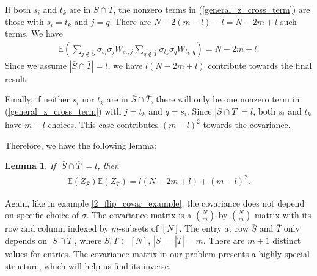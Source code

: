 \documentclass[10pt]{article}
\newcommand{\e}{\mathbb{E}}
\newtheorem{lemma}{\bf Lemma}
\newenvironment{Proof of lemma}{\noindent{\bf Proof of Lemma}}{\hfill$\Box$\newline}
\newenvironment{Proof of claim}{\noindent{\bf Proof of claim}}{\hfill$\Box$\newline}
\newenvironment{Proof of theorem}{\noindent{\bf Proof of Theorem}}{\hfill\scriptsize{$\Box$}\newline}
\newenvironment{Proof of theorems}{\noindent{\bf Proof of Theorems}}{\hfill$\Box$\newline}
\newenvironment{Proof of proposition}{\noindent{\bf Proof of Proposition}}{\hfill$\Box$\newline}
\newenvironment{Proof of propositions}{\noindent{\bf Proof of Propositions}}{\hfill$\Box$\newline}
\newenvironment{Proof of exercise}{\noindent{\it Proof of Exercise:}}{\hfill$\Box$}
\numberwithin{equation}{section}
\begin{document}
If both $s_i$ and $t_k$ are in $\bar{S} \cap \bar{T}$, the nonzero terms in (\ref{general_z_cross_term}) are those with $s_i = t_k$ and $j=q$. There are $N-2(m-l)-l = N-2m+l$ such terms. We have
\begin{align}
    \e \left(\sum_{j \notin \bar{S}} \sigma_{s_i} \sigma_j W_{s_i,j} \sum_{q \notin \bar{T}} \sigma_{t_k} \sigma_q W_{t_k,q} \right) = N-2m+l.
\end{align}
Since we assume $|\bar{S} \cap \bar{T}| = l$, we have $l(N-2m+l)$ contribute towards the final result.

Finally, if neither $s_i$ nor $t_k$ are in $\bar{S} \cap \bar{T}$, there will only be one nonzero term in (\ref{general_z_cross_term}) with $j = t_k$ and $q = s_i$. Since $|\bar{S} \cap \bar{T}| = l$, both $s_i$ and $t_k$ have $m-l$ choices. This case contributes $(m-l)^2$ towards the covariance.

Therefore, we have the following lemma:
\begin{lemma} \label{covar_lemma}
    If $|\bar{S} \cap \bar{T}| = l$, then
\begin{align} \label{covar_entry}
    \e(Z_{\bar{S}})\e(Z_{\bar{T}}) = l(N-2m+l)+(m-l)^2.
\end{align}
\end{lemma}


Again, like in example \ref{2_flip_covar_example}, the covariance does not depend on specific choice of $\sigma$. The covariance matrix is a $\binom{N}{m}$-by-$\binom{N}{m}$ matrix with its row and column indexed by $m$-subsets of $[N]$. The entry at row $\bar{S}$ and $\bar{T}$ only depends on $|\bar{S} \cap \bar{T}|$, where $\bar{S},\bar{T} \subset [N]$, $|\bar{S}| = |\bar{T}| = m$. There are $m+1$ distinct values for entries. The covariance matrix in our problem presents a highly special structure, which will help us find its inverse. 
\end{document}
